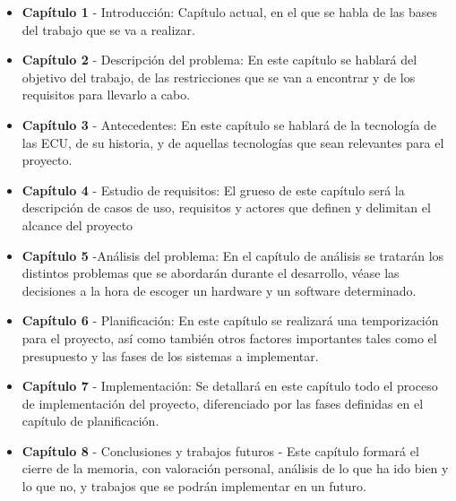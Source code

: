 \begin{itemize}
    \item \textbf{Capítulo 1} - Introducción: Capítulo actual, en el que se habla de las bases del trabajo que se va a realizar.
    \item \textbf{Capítulo 2} - Descripción del problema: En este capítulo se hablará del objetivo del trabajo, de las restricciones que se van a encontrar y de los requisitos para llevarlo a cabo.
    \item \textbf{Capítulo 3} - Antecedentes: En este capítulo se hablará de la tecnología de las ECU, de su historia, y de aquellas tecnologías que sean relevantes para el proyecto. 
    \item \textbf{Capítulo 4} - Estudio de requisitos: El grueso de este capítulo será la descripción de casos de uso, requisitos y actores que definen y delimitan el alcance del proyecto 
    \item \textbf{Capítulo 5} -Análisis del problema: En el capítulo de análisis se tratarán los distintos problemas que se abordarán durante el desarrollo, véase las decisiones a la hora de escoger un hardware y un software determinado.
    \item \textbf{Capítulo 6} -  Planificación: En este capítulo se realizará una temporización para el proyecto, así como también otros factores importantes tales como el presupuesto y las fases de los sistemas a implementar. 
    \item \textbf{Capítulo 7} - Implementación: Se detallará en este capítulo todo el proceso de implementación del proyecto, diferenciado por las fases definidas en el capítulo de planificación. 
    \item \textbf{Capítulo 8} - Conclusiones y trabajos futuros - Este capítulo formará el cierre de la memoria, con valoración personal, análisis de lo que ha ido bien y lo que no, y trabajos que se podrán implementar en un futuro. 
\end{itemize}
